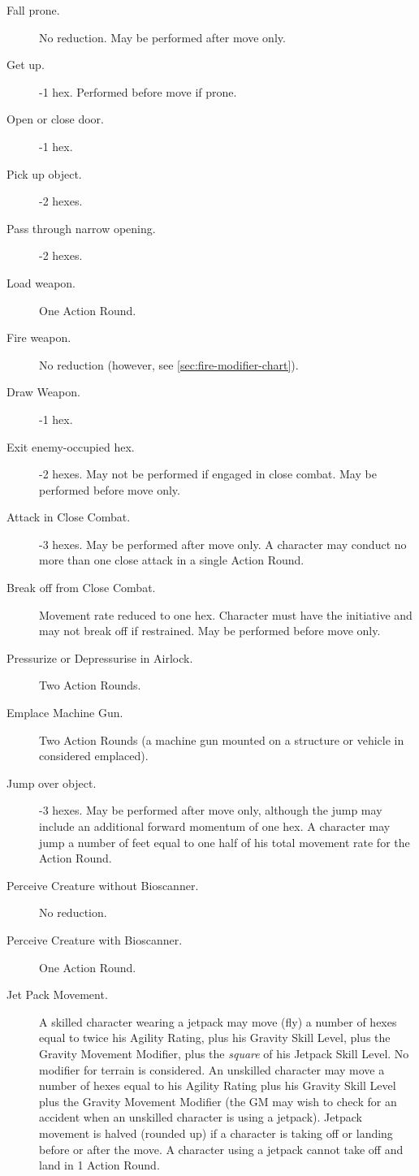 \begin{description}
\item[Fall prone.] No reduction. May be performed after move only.
\item[Get up.] -1 hex. Performed before move if prone.
\item[Open or close door.] -1 hex.
\item[Pick up object.] -2 hexes.
\item[Pass through narrow opening.] -2 hexes.
\item[Load weapon.] One Action Round.
\item[Fire weapon.] No reduction (however, see
  \ref{sec:fire-modifier-chart}).
\item[Draw Weapon.] -1 hex.
\item[Exit enemy-occupied hex.] -2 hexes. May not be performed if
  engaged in close combat. May be performed before move only.
\item[Attack in Close Combat.] -3 hexes. May be performed after move
  only. A character may conduct no more than one close attack in a
  single Action Round.
\item[Break off from Close Combat.] Movement rate reduced to one hex.
  Character must have the initiative and may not break off if
  restrained. May be performed before move only.
\item[Pressurize or Depressurise in Airlock.] Two Action Rounds.
\item[Emplace Machine Gun.] Two Action Rounds (a machine gun mounted on
  a structure or vehicle in considered emplaced).
\item[Jump over object.] -3 hexes. May be performed after move only,
  although the jump may include an additional forward momentum of one
  hex. A character may jump a number of feet equal to one half of his
  total movement rate for the Action Round.
\item[Perceive Creature without Bioscanner.] No reduction.
\item[Perceive Creature with Bioscanner.] One Action Round.
\item[Jet Pack Movement.] A skilled character wearing a jetpack may
  move (fly) a number of hexes equal to twice his Agility Rating, plus
  his Gravity Skill Level, plus the Gravity Movement Modifier, plus
  the \emph{square} of his Jetpack Skill Level. No modifier for
  terrain is considered.  An unskilled character may move a number of
  hexes equal to his Agility Rating plus his Gravity Skill Level plus
  the Gravity Movement Modifier (the GM may wish to check for an
  accident when an unskilled character is using a jetpack). Jetpack
  movement is halved (rounded up) if a character is taking off or
  landing before or after the move. A character using a jetpack cannot
  take off and land in 1 Action Round.
\end{description}

